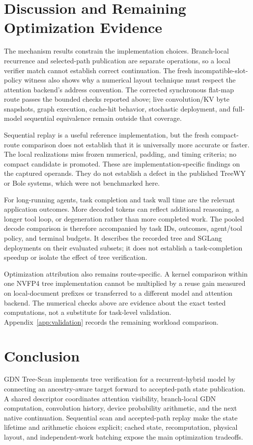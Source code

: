 \documentclass[conference]{IEEEtran}
\newcommand{\sys}{GDN Tree-Scan}
\begin{document}
\section{Discussion and Remaining Optimization Evidence}
\label{sec:planned}
The mechanism results constrain the implementation choices. Branch-local recurrence and selected-path publication are separate operations, so a local verifier match cannot establish correct continuation. The fresh incompatible-slot-policy witness also shows why a numerical layout technique must respect the attention backend's address convention. The corrected synchronous flat-map route passes the bounded checks reported above; live convolution/KV byte snapshots, graph execution, cache-hit behavior, stochastic deployment, and full-model sequential equivalence remain outside that coverage.

Sequential replay is a useful reference implementation, but the fresh compact-route comparison does not establish that it is universally more accurate or faster. The local realizations miss frozen numerical, padding, and timing criteria; no compact candidate is promoted. These are implementation-specific findings on the captured operands. They do not establish a defect in the published TreeWY or Bole systems, which were not benchmarked here.

For long-running agents, task completion and task wall time are the relevant application outcomes. More decoded tokens can reflect additional reasoning, a longer tool loop, or degeneration rather than more completed work. The pooled decode comparison is therefore accompanied by task IDs, outcomes, agent/tool policy, and terminal budgets. It describes the recorded tree and SGLang deployments on their evaluated subsets; it does not establish a task-completion speedup or isolate the effect of tree verification.

Optimization attribution also remains route-specific. A kernel comparison within one NVFP4 tree implementation cannot be multiplied by a reuse gain measured on local-document prefixes or transferred to a different model and attention backend. The numerical checks above are evidence about the exact tested computations, not a substitute for task-level validation. Appendix~\ref{app:validation} records the remaining workload comparison.

\section{Conclusion}
\sys{} implements tree verification for a recurrent-hybrid model by connecting an ancestry-aware target forward to accepted-path state publication. A shared descriptor coordinates attention visibility, branch-local GDN computation, convolution history, device probability arithmetic, and the next native continuation. Sequential scan and accepted-path replay make the state lifetime and arithmetic choices explicit; cached state, recomputation, physical layout, and independent-work batching expose the main optimization tradeoffs.
\end{document}
